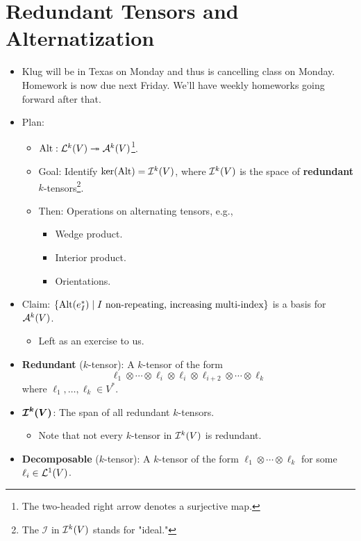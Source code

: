 \documentclass[../notes.tex]{subfiles}
\begin{document}
\section{Redundant Tensors and Alternatization}
\begin{itemize}
    \item {}Klug will be in Texas on Monday and thus is cancelling class on Monday. Homework is now due next Friday. We'll have weekly homeworks going forward after that.
    \item Plan:
    \begin{itemize}
        \item $\Alt:\lin[k]{V}\twoheadrightarrow\alt[k]{V}$\footnote{The two-headed right arrow denotes a surjective map.}.
        \item Goal: Identify $\ker(\Alt)=\ide[k]{V}$, where $\ide[k]{V}$ is the space of \textbf{redundant} $k$-tensors\footnote{The $\mathcal{I}$ in $\ide[k]{V}$ stands for "ideal."}.
        \item Then: Operations on alternating tensors, e.g.,
        \begin{itemize}
            \item Wedge product.
            \item Interior product.
            \item Orientations.
        \end{itemize}
    \end{itemize}
    \item Claim: $\{\Alt(e_I^*)\mid I\text{ non-repeating, increasing multi-index}\}$ is a basis for $\alt[k]{V}$.
    \begin{itemize}
        \item Left as an exercise to us.
    \end{itemize}
    \item \textbf{Redundant} ($k$-tensor): A $k$-tensor of the form
    \begin{equation*}
        \ell_1\otimes\cdots\otimes\ell_i\otimes\ell_i\otimes\ell_{i+2}\otimes\cdots\otimes\ell_k
    \end{equation*}
    where $\ell_1,\dots,\ell_k\in V^*$.
    \item $\bm{\ide[k]{V}}$: The span of all redundant $k$-tensors.
    \begin{itemize}
        \item Note that not every $k$-tensor in $\ide[k]{V}$ is redundant.
    \end{itemize}
    \item \textbf{Decomposable} ($k$-tensor): A $k$-tensor of the form $\ell_1\otimes\cdots\otimes\ell_k$ for some $\ell_i\in\lin[1]{V}$.

\end{itemize}
\end{document}
